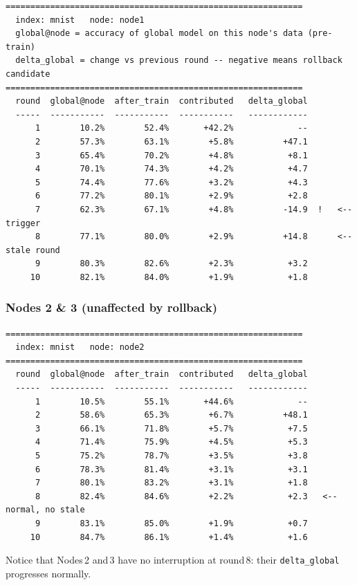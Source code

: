 \documentclass[11pt,a4paper]{article}
\begin{document}
\begin{lstlisting}[style=log]
============================================================
  index: mnist   node: node1
  global@node = accuracy of global model on this node's data (pre-train)
  delta_global = change vs previous round -- negative means rollback candidate
============================================================
  round  global@node  after_train  contributed   delta_global
  -----  -----------  -----------  -----------   ------------
      1        10.2%        52.4%       +42.2%             --
      2        57.3%        63.1%        +5.8%          +47.1
      3        65.4%        70.2%        +4.8%           +8.1
      4        70.1%        74.3%        +4.2%           +4.7
      5        74.4%        77.6%        +3.2%           +4.3
      6        77.2%        80.1%        +2.9%           +2.8
      7        62.3%        67.1%        +4.8%          -14.9  !   <-- trigger
      8        77.1%        80.0%        +2.9%          +14.8      <-- stale round
      9        80.3%        82.6%        +2.3%           +3.2
     10        82.1%        84.0%        +1.9%           +1.8
\end{lstlisting}

\subsubsection*{Nodes 2 \& 3 (unaffected by rollback)}

\begin{lstlisting}[style=log]
============================================================
  index: mnist   node: node2
============================================================
  round  global@node  after_train  contributed   delta_global
  -----  -----------  -----------  -----------   ------------
      1        10.5%        55.1%       +44.6%             --
      2        58.6%        65.3%        +6.7%          +48.1
      3        66.1%        71.8%        +5.7%           +7.5
      4        71.4%        75.9%        +4.5%           +5.3
      5        75.2%        78.7%        +3.5%           +3.8
      6        78.3%        81.4%        +3.1%           +3.1
      7        80.1%        83.2%        +3.1%           +1.8
      8        82.4%        84.6%        +2.2%           +2.3   <-- normal, no stale
      9        83.1%        85.0%        +1.9%           +0.7
     10        84.7%        86.1%        +1.4%           +1.6
\end{lstlisting}

\noindent Notice that Nodes\,2 and\,3 have no interruption at round\,8:
their \texttt{delta\_global} progresses normally.
\end{document}
